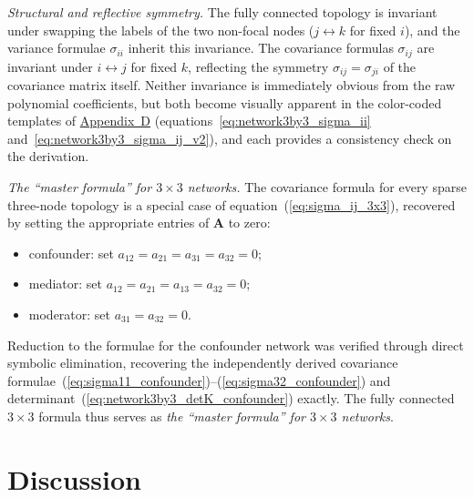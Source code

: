 \documentclass[12pt]{article}
\begin{document}
\vspace{6pt}
\textit{Structural and reflective symmetry.}
The fully connected topology is invariant under swapping the
labels of the two non-focal nodes ($j \leftrightarrow k$ for
fixed $i$), and the variance formulae $\sigma_{ii}$ inherit
this invariance. The covariance formulas $\sigma_{ij}$ are invariant under $i \leftrightarrow j$ for fixed $k$,
reflecting the symmetry $\sigma_{ij}=\sigma_{ji}$ of the
covariance matrix itself.
Neither invariance is immediately obvious from the raw
polynomial coefficients, but both become visually apparent in
the color-coded templates of
\hyperref[app:appD]{Appendix~D}
(equations~\ref{eq:network3by3_sigma_ii}
and~\ref{eq:network3by3_sigma_ij_v2}), and each provides a
consistency check on the derivation.

\vspace{6pt}
\textit{The ``master formula'' for $3\times3$ networks.}
The covariance formula for every sparse three-node topology is a special case of
equation~(\ref{eq:sigma_ij_3x3}), recovered by setting the
appropriate entries of $\mathbf{A}$ to zero:
\begin{itemize}
\item confounder: set $a_{12}=a_{21}=a_{31}=a_{32}=0$;
\item mediator: set $a_{12}=a_{21}=a_{13}=a_{32}=0$;
\item moderator: set $a_{31}=a_{32}=0$.
\end{itemize}
Reduction to the formulae for the confounder network was verified through
direct symbolic elimination, recovering the
independently derived covariance
formulae~(\ref{eq:sigma11_confounder})--(\ref{eq:sigma32_confounder})
and determinant~(\ref{eq:network3by3_detK_confounder}) exactly.
The fully connected $3\times3$ formula thus serves as
\textit{the ``master formula'' for $3\times3$ networks}.


\section*{Discussion}
\end{document}

